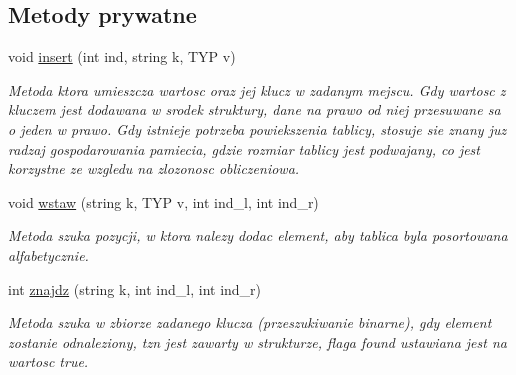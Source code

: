 \subsection*{\-Metody prywatne}
\begin{DoxyCompactItemize}
\item 
void \hyperlink{classtablica__asocjacyjna_a9fc42088f50eca25e7ae4ce8c84ddf4d}{insert} (int ind, string k, \-T\-Y\-P v)
\begin{DoxyCompactList}\small\item\em \-Metoda ktora umieszcza wartosc oraz jej klucz w zadanym mejscu. \-Gdy wartosc z kluczem jest dodawana w srodek struktury, dane na prawo od niej przesuwane sa o jeden w prawo. \-Gdy istnieje potrzeba powiekszenia tablicy, stosuje sie znany juz radzaj gospodarowania pamiecia, gdzie rozmiar tablicy jest podwajany, co jest korzystne ze wzgledu na zlozonosc obliczeniowa. \end{DoxyCompactList}\item 
void \hyperlink{classtablica__asocjacyjna_a5da9eecc7f4e0d7bcf31e8c5c7c49d06}{wstaw} (string k, \-T\-Y\-P v, int ind\-\_\-l, int ind\-\_\-r)
\begin{DoxyCompactList}\small\item\em \-Metoda szuka pozycji, w ktora nalezy dodac element, aby tablica byla posortowana alfabetycznie. \end{DoxyCompactList}\item 
int \hyperlink{classtablica__asocjacyjna_a70a184c5358e47655211e68925c2e12e}{znajdz} (string k, int ind\-\_\-l, int ind\-\_\-r)
\begin{DoxyCompactList}\small\item\em \-Metoda szuka w zbiorze zadanego klucza (przeszukiwanie binarne), gdy element zostanie odnaleziony, tzn jest zawarty w strukturze, flaga found ustawiana jest na wartosc true. \end{DoxyCompactList}\end{DoxyCompactItemize}
